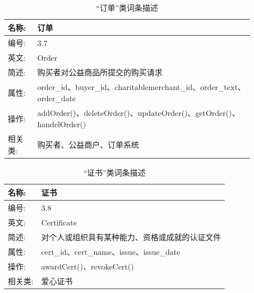 \begin{table}[H]  
\caption{“订单”类词条描述}  
\begin{center}  
    \begin{tabular}{l p{11cm}} 
        \hline
        \quad 名称:  &  订单 \\
        \hline
        \quad 编号:  & 3.7 \\
        \hline
        \quad 英文:  &  Order \\
        \hline
        \quad 简述:  & 购买者对公益商品所提交的购买请求 \\
        \hline
        \quad 属性:  & order\_id、buyer\_id、charitablemerchant\_id、order\_text、order\_date \\
        \hline
        \quad 操作:  & addOrder()、deleteOrder()、updateOrder()、getOrder()、handelOrder()\\
        \hline
        \quad 相关类:  & 购买者、公益商户、订单系统 \\
        \hline
    \end{tabular}
\end{center}
\end{table}

\begin{table}[H]  
\caption{“证书”类词条描述}  
\begin{center}  
    \begin{tabular}{l p{11cm}} 
        \hline
        \quad 名称:  &  证书 \\
        \hline
        \quad 编号:  & 3.8 \\
        \hline
        \quad 英文:  &  Certificate \\
        \hline
        \quad 简述:  & 对个人或组织具有某种能力、资格或成就的认证文件 \\
        \hline
        \quad 属性:  & cert\_id、cert\_name、issue、issue\_date\\
        \hline
        \quad 操作:  & awardCert()、revokeCert() \\
        \hline
        \quad 相关类:  & 爱心证书 \\
        \hline
    \end{tabular}
\end{center}
\end{table}

